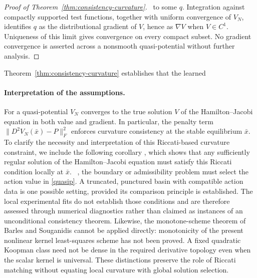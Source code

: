 \documentclass[11pt]{article}
\theoremstyle{plain}      %
\theoremstyle{definition} %
\providecommand{\DIFaddtex}[1]{{\protect\color{blue}#1}} %
\providecommand{\DIFdeltex}[1]{{\protect\color{red}#1}} %
\providecommand{\DIFaddbegin}{} %
\providecommand{\DIFaddend}{} %
\providecommand{\DIFdelbegin}{} %
\providecommand{\DIFdelend}{} %
\providecommand{\DIFadd}[1]{\texorpdfstring{\DIFaddtex{#1}}{#1}} %
\providecommand{\DIFdel}[1]{\texorpdfstring{\DIFdeltex{#1}}{}} %
\newcommand{\DIFscaledelfig}{1.0}
\newlength{\DIFdelgraphicswidth} %
\newlength{\DIFdelgraphicsheight} %
\newcommand{\DIFaddincludegraphics}[2][]{{\color{blue}\fbox{\DIFOincludegraphics[#1]{#2}}}} %
\newcommand{\DIFdelincludegraphics}[2][]{%
\sbox{\DIFdelgraphicsbox}{\DIFOincludegraphics[#1]{#2}}%
\settoboxwidth{\DIFdelgraphicswidth}{\DIFdelgraphicsbox} %
\settoboxtotalheight{\DIFdelgraphicsheight}{\DIFdelgraphicsbox} %
\scalebox{\DIFscaledelfig}{%
\parbox[b]{\DIFdelgraphicswidth}{\usebox{\DIFdelgraphicsbox}\\[-\baselineskip] \rule{\DIFdelgraphicswidth}{0em}}\llap{\resizebox{\DIFdelgraphicswidth}{\DIFdelgraphicsheight}{%
\setlength{\unitlength}{\DIFdelgraphicswidth}%
\begin{picture}(1,1)%
\thicklines\linethickness{2pt} %
{\color[rgb]{1,0,0}\put(0,0){\framebox(1,1){}}}%
{\color[rgb]{1,0,0}\put(0,0){\line( 1,1){1}}}%
{\color[rgb]{1,0,0}\put(0,1){\line(1,-1){1}}}%
\end{picture}%
}\hspace*{3pt}}} %
} %
\DeclareRobustCommand{\DIFaddbegin}{\DIFOaddbegin \let\includegraphics\DIFaddincludegraphics} %
\DeclareRobustCommand{\DIFaddend}{\DIFOaddend \let\includegraphics\DIFOincludegraphics} %
\DeclareRobustCommand{\DIFdelbegin}{\DIFOdelbegin \let\includegraphics\DIFdelincludegraphics} %
\DeclareRobustCommand{\DIFdelend}{\DIFOaddend \let\includegraphics\DIFOincludegraphics} %
\begin{document}
\begin{proof}[Proof of Theorem~\ref{thm:consistency-curvature}]
\DIFdelend\ \DIFaddbegin \DIFadd{to some $q$. Integration against compactly supported test functions, together with uniform convergence of $V_N$, identifies $q$ as the distributional gradient of $V$, hence as $\nabla V$ when $V\in C^1$. Uniqueness of this limit gives convergence on every compact subset. No gradient convergence is asserted across a nonsmooth quasi-potential without further analysis.
}\DIFaddend \end{proof}

\DIFdelbegin %

\DIFdel{Theorem~\ref{thm:consistency-curvature} establishes that the learned }\DIFdelend \DIFaddbegin \paragraph{\DIFadd{Interpretation of the assumptions.}}
\DIFadd{For a }\DIFaddend quasi-potential \DIFdelbegin \DIFdel{$V_N$ converges to the true solution $V$ of the Hamilton--Jacobi equation in both value and gradient. In particular, the penalty term $\|D^2 V_N(\bar{x}) - P\|_F^2$ enforces curvature consistency at the stable equilibrium $\bar{x}$. To clarify the necessity and interpretation of this Riccati-based curvature constraint, we include the following corollary , which shows that any sufficiently regular solution of the Hamilton--Jacobi equation must satisfy this Riccati condition locally at $\bar{x}$. }\DIFdelend\ \DIFaddbegin \DIFadd{, the boundary or admissibility problem must select the action value in \eqref{quasip}. A truncated, punctured basin with compatible action data is one possible setting, provided its comparison principle is established. The local experimental fits do not establish those conditions and are therefore assessed through numerical diagnostics rather than claimed as instances of an unconditional consistency theorem. Likewise, the monotone-scheme theorem of Barles and Souganidis \cite{Barles1991} cannot be applied directly: monotonicity of the present nonlinear kernel least-squares scheme has not been proved. A fixed quadratic Koopman class need not be dense in the required derivative topology even when the scalar kernel is universal. These distinctions preserve the role of Riccati matching without equating local curvature with global solution selection.
}\DIFaddend 
\end{document}
